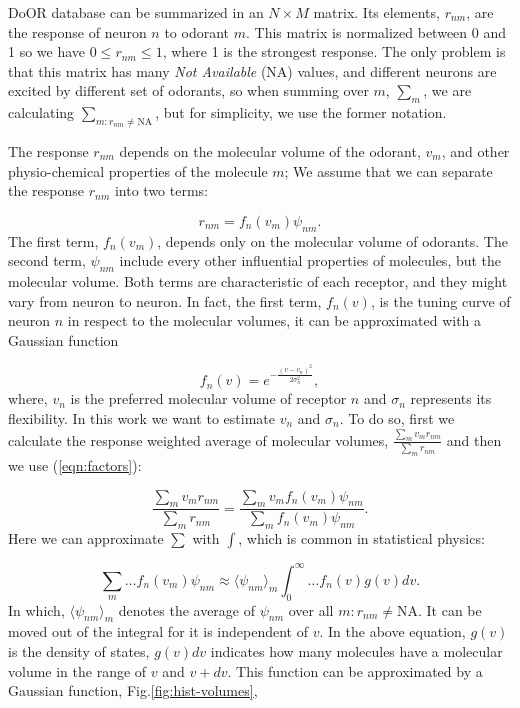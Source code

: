 \documentclass[11pt]{paper} %
\begin{document}
DoOR database can be summarized in an $N\times M$ matrix. 
Its elements, $r_{nm}$, are the response of neuron $n$ to odorant $m$. 
This matrix is normalized between 0 and 1 so we have $0 \le r_{nm} \le 1$, where 1 is the strongest response.
The only problem is that this matrix has many {\it Not Available} (NA) values, 
and different neurons are excited by different set of odorants, 
so  when summing over $m$, $\sum_m$, we are calculating $\sum_{m: r_{nm} \neq \text{NA}}$, 
but for simplicity, 
we use the former notation. 

The response $r_{nm}$ depends on the molecular volume of the odorant, $v_m$, 
and other physio-chemical properties of the molecule $m$; 
We assume that we can separate the response $r_{nm}$ into two terms:

\begin{equation}
	r_{nm} = f_n(v_m) \psi_{nm}.
	\label{eqn:factors}
\end{equation}
The first term, $f_n(v_m)$, depends only on the molecular volume of odorants.
The second term, $\psi_{nm}$ include every other influential properties of molecules, but the molecular volume.
Both terms are characteristic of each receptor, and they might vary from neuron to neuron.
In fact, the first term, $f_n(v)$, is the tuning curve of neuron $n$ in respect to the molecular volumes, 
it can be approximated with a Gaussian function

\begin{equation}
	\displaystyle f_n(v) = e^{-\frac{(v-v_n)^2}{2\sigma^2_n}}, 
	\label{eqn:volume-dependence}
\end{equation}
where, $v_n$ is the preferred molecular volume of receptor $n$ and $\sigma_n$ represents its flexibility. 
In this work we want to estimate $v_n$ and $\sigma_n$. 
To do so, first we calculate the response weighted average of molecular volumes, 
$\frac{\sum_{m} v_m r_{nm}}{\sum_{m} r_{nm}}$ and then we use (\ref{eqn:factors}):

\begin{equation}
	\frac{\displaystyle \sum_{m} v_m r_{nm}}{\displaystyle \sum_{m} r_{nm}} = \frac{\displaystyle \sum_{m} v_m f_n(v_m) \psi_{nm}}{\displaystyle \sum_{m} f_n(v_m) \psi_{nm}}.
	\label{eqn:sta}
\end{equation}
Here we can approximate $\sum$ with $\int$, which is common in statistical physics:

\begin{equation}
	\sum_{m} \dots f_n(v_m) \psi_{nm} \approx  \langle \psi_{nm} \rangle_m \int_0^\infty \dots f_n(v) g(v)  dv. 
	\label{eqn:sigma_to_int}
\end{equation}
In which, 
$\langle \psi_{nm} \rangle_m$ denotes the average of $\psi_{nm}$ over all $m: r_{nm} \neq \text{NA}$. 
It can be moved out of the integral for it is independent of $v$.
In the above equation, 
$g(v)$ is the density of states, $g(v) dv$ indicates how many molecules have a molecular volume in the range of $v$ and $v+dv$.
This function can be approximated by a Gaussian function, Fig.\ref{fig:hist-volumes}, 
\end{document}
